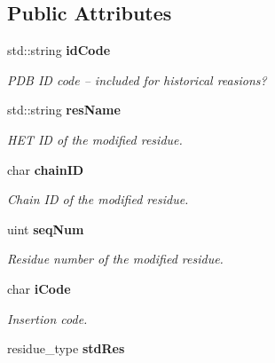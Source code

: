 \subsection*{Public Attributes}
\begin{CompactItemize}
\item 
std::string \bf{id\-Code}\label{structASCbase_1_1PDBBase_1_1modres__record__type_6a68803756d56ad22aa52b64a0ff3c5c}

\begin{CompactList}\small\item\em PDB ID code -- included for historical reasions? \item\end{CompactList}\item 
std::string \bf{res\-Name}\label{structASCbase_1_1PDBBase_1_1modres__record__type_bed137d971bf629a1ae314a15abe02a0}

\begin{CompactList}\small\item\em HET ID of the modified residue. \item\end{CompactList}\item 
char \bf{chain\-ID}\label{structASCbase_1_1PDBBase_1_1modres__record__type_4646af5f898e7f605c660c6a03e99326}

\begin{CompactList}\small\item\em Chain ID of the modified residue. \item\end{CompactList}\item 
uint \bf{seq\-Num}\label{structASCbase_1_1PDBBase_1_1modres__record__type_8e7203fd189ff474fb4df62d4c7370a5}

\begin{CompactList}\small\item\em Residue number of the modified residue. \item\end{CompactList}\item 
char \bf{i\-Code}\label{structASCbase_1_1PDBBase_1_1modres__record__type_ce2a7c9abb09dbdb2e3bcef4e4d8452c}

\begin{CompactList}\small\item\em Insertion code. \item\end{CompactList}\item 
residue\_\-type \bf{std\-Res}\label{structASCbase_1_1PDBBase_1_1modres__record__type_875e1b41b9c3d177a3d41bbe4d629ea1}


\end{CompactItemize}
